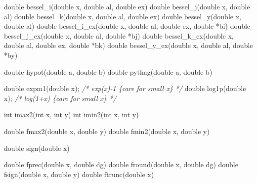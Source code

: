 \documentclass[]{book}
\newenvironment{Shaded}{\begin{snugshade}}{\end{snugshade}}
\newcommand{\CommentTok}[1]{\textcolor[rgb]{0.56,0.35,0.01}{\textit{#1}}}
\newcommand{\DataTypeTok}[1]{\textcolor[rgb]{0.13,0.29,0.53}{#1}}
\newcommand{\NormalTok}[1]{#1}
\begin{document}
\begin{Shaded}
\begin{Highlighting}[]
\DataTypeTok{double}\NormalTok{ bessel_i(}\DataTypeTok{double}\NormalTok{ x, }\DataTypeTok{double}\NormalTok{ al, }\DataTypeTok{double}\NormalTok{ ex) }
\DataTypeTok{double}\NormalTok{ bessel_j(}\DataTypeTok{double}\NormalTok{ x, }\DataTypeTok{double}\NormalTok{ al)            }
\DataTypeTok{double}\NormalTok{ bessel_k(}\DataTypeTok{double}\NormalTok{ x, }\DataTypeTok{double}\NormalTok{ al, }\DataTypeTok{double}\NormalTok{ ex) }
\DataTypeTok{double}\NormalTok{ bessel_y(}\DataTypeTok{double}\NormalTok{ x, }\DataTypeTok{double}\NormalTok{ al)            }
\DataTypeTok{double}\NormalTok{ bessel_i_ex(}\DataTypeTok{double}\NormalTok{ x, }\DataTypeTok{double}\NormalTok{ al, }\DataTypeTok{double}\NormalTok{ ex, }\DataTypeTok{double}\NormalTok{ *bi)  }
\DataTypeTok{double}\NormalTok{ bessel_j_ex(}\DataTypeTok{double}\NormalTok{ x, }\DataTypeTok{double}\NormalTok{ al, }\DataTypeTok{double}\NormalTok{ *bj)         }
\DataTypeTok{double}\NormalTok{ bessel_k_ex(}\DataTypeTok{double}\NormalTok{ x, }\DataTypeTok{double}\NormalTok{ al, }\DataTypeTok{double}\NormalTok{ ex, }\DataTypeTok{double}\NormalTok{ *bk)  }
\DataTypeTok{double}\NormalTok{ bessel_y_ex(}\DataTypeTok{double}\NormalTok{ x, }\DataTypeTok{double}\NormalTok{ al, }\DataTypeTok{double}\NormalTok{ *by) }

\DataTypeTok{double}\NormalTok{ hypot(}\DataTypeTok{double}\NormalTok{ a, }\DataTypeTok{double}\NormalTok{ b)    }
\DataTypeTok{double}\NormalTok{ pythag(}\DataTypeTok{double}\NormalTok{ a, }\DataTypeTok{double}\NormalTok{ b)   }

\DataTypeTok{double}\NormalTok{ expm1(}\DataTypeTok{double}\NormalTok{ x); }\CommentTok{/* exp(x)-1 \{care for small x\} */}   
\DataTypeTok{double}\NormalTok{ log1p(}\DataTypeTok{double}\NormalTok{ x); }\CommentTok{/* log(1+x) \{care for small x\} */} 

\DataTypeTok{int}\NormalTok{ imax2(}\DataTypeTok{int}\NormalTok{ x, }\DataTypeTok{int}\NormalTok{ y)     }
\DataTypeTok{int}\NormalTok{ imin2(}\DataTypeTok{int}\NormalTok{ x, }\DataTypeTok{int}\NormalTok{ y) }

\DataTypeTok{double}\NormalTok{ fmax2(}\DataTypeTok{double}\NormalTok{ x, }\DataTypeTok{double}\NormalTok{ y)    }
\DataTypeTok{double}\NormalTok{ fmin2(}\DataTypeTok{double}\NormalTok{ x, }\DataTypeTok{double}\NormalTok{ y)    }

\DataTypeTok{double}\NormalTok{ sign(}\DataTypeTok{double}\NormalTok{ x)       }

\DataTypeTok{double}\NormalTok{ fprec(}\DataTypeTok{double}\NormalTok{ x, }\DataTypeTok{double}\NormalTok{ dg)   }
\DataTypeTok{double}\NormalTok{ fround(}\DataTypeTok{double}\NormalTok{ x, }\DataTypeTok{double}\NormalTok{ dg)  }
\DataTypeTok{double}\NormalTok{ fsign(}\DataTypeTok{double}\NormalTok{ x, }\DataTypeTok{double}\NormalTok{ y)    }
\DataTypeTok{double}\NormalTok{ ftrunc(}\DataTypeTok{double}\NormalTok{ x)     }
\end{Highlighting}
\end{Shaded}
\end{document}
